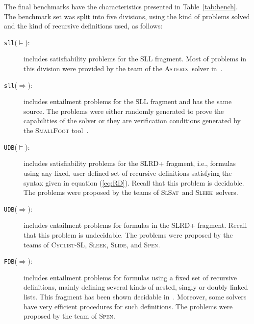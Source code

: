 \documentclass[twoside,11pt]{article}
\newcommand{\limp}{\Rightarrow}
\newcommand{\sllsat}{\texttt{sll}($\models$)}
\newcommand{\sllent}{\texttt{sll}($\limp$)}
\newcommand{\FDBent}{\texttt{FDB}($\limp$)}
\newcommand{\UDBsat}{\texttt{UDB}($\models$)}
\newcommand{\UDBent}{\texttt{UDB}($\limp$)}
\newcommand{\ASTERIX}{\textsc{Asterix}}
\newcommand{\CYCLIST}{\textsc{Cyclist-SL}}
\newcommand{\SLEEK}{\textsc{Sleek}}
\newcommand{\SLIDE}{\textsc{Slide}}
\newcommand{\SLSAT}{\textsc{SlSat}}
\newcommand{\SPEN}{\textsc{Spen}}
\begin{document}
The final benchmarks have the characteristics presented in Table~\ref{tab:bench}.
The benchmark set was split into five divisions, using the kind of problems solved and the kind of recursive definitions used, as follows:
\begin{description}
\item[\sllsat:] includes satisfiability problems for the SLL fragment.
Most of problems in this division were provided by the team of the \ASTERIX\ solver in~\cite{PerezR11}.

\item[\sllent:] includes entailment problems for the SLL fragment and has the same source. The problems were either randomly generated to prove the capabilities of the solver or they are verification conditions generated by the \textsc{SmallFoot} tool~\cite{SmallFootsite}.

\item[\UDBsat:] includes satisfiability problems for the SLRD+ fragment, i.e., formulas using any fixed, user-defined set of recursive definitions satisfying the syntax given in equation (\ref{eq:RD}).
Recall that this problem is decidable. 
The problems were proposed by the teams of \SLSAT\ and \SLEEK\ solvers.

\item[\UDBent:] includes entailment problems for formulas in the SLRD+ fragment.
Recall that this problem is undecidable. 
The problems were proposed by the teams of \CYCLIST, \SLEEK, \SLIDE, and \SPEN.

\item[\FDBent:] includes entailment problems for formulas using a fixed set of recursive definitions, mainly defining several kinds of nested, singly or doubly linked lists. This fragment has been shown decidable in~\cite{AntonopoulosGHKO14,EneaLSV14}.
Moreover, some solvers have very efficient procedures for such definitions.
The problems were proposed by the team of \SPEN.
\end{description} 
 
\end{document}

